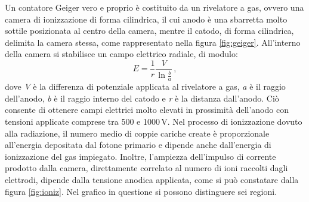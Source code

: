 \documentclass{report}
\newcommand{\figref}[1]{figura \ref{#1}}
\numberwithin{equation}{section}
\numberwithin{figure}{section}
\begin{document}
\noindent Un contatore Geiger vero e proprio è costituito da un rivelatore a gas, ovvero una camera di ionizzazione di forma cilindrica, il cui anodo è una sbarretta molto sottile posizionata al centro della camera, mentre il catodo, di forma cilindrica, delimita la camera stessa, come rappresentato nella \figref{fig:geiger}. All'interno della camera si stabilisce un campo elettrico radiale, di modulo:
\begin{equation}
    E = \frac{1}{r}\frac{V}{\ln{\frac{b}{a}}}\,,
\end{equation}
dove \textit{V} è la differenza di potenziale applicata al rivelatore a gas, \textit{a} è il raggio dell'anodo, \textit{b} è il raggio interno del catodo e \textit{r} è la distanza dall'anodo. Ciò consente di ottenere campi elettrici molto elevati in prossimità dell'anodo con tensioni applicate comprese tra 500 e 1000\,V. Nel processo di ionizzazione dovuto alla radiazione, il numero medio di coppie cariche create è proporzionale all'energia depositata dal fotone primario e dipende anche dall'energia di ionizzazione del gas impiegato. Inoltre, l’ampiezza dell'impulso di corrente prodotto dalla camera, direttamente correlato al numero di ioni raccolti dagli elettrodi, dipende dalla tensione anodica applicata, come si può constatare dalla \figref{fig:ioniz}. Nel grafico in questione si possono distinguere sei regioni.
\end{document}
